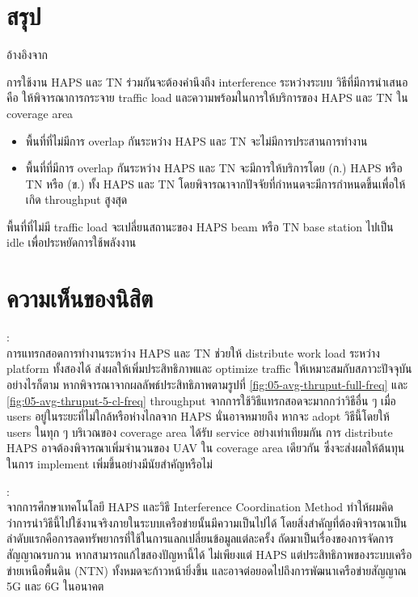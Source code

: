 \section{สรุป}

อ้างอิงจาก \cite[Interference Coordination Method for Integrated HAPS-Terrestrial Networks]{liu2021interference}

การใช้งาน HAPS และ TN ร่วมกันจะต้องคำนึงถึง interference ระหว่างระบบ
วิธีที่มีการนำเสนอคือ ให้พิจารณาการกระจาย traffic load และความพร้อมในการให้บริการของ
HAPS และ TN ใน coverage area

\begin{itemize}
    \item พื้นที่ที่ไม่มีการ overlap กันระหว่าง HAPS และ TN จะไม่มีการประสานการทำงาน
    \item พื้นที่ที่มีการ overlap กันระหว่าง HAPS และ TN จะมีการให้บริการโดย (ก.) HAPS หรือ TN หรือ (ข.) ทั้ง HAPS และ TN
            โดยพิจารณาจากปัจจัยที่กำหนดจะมีการกำหนดขึ้นเพื่อให้เกิด throughput สูงสุด
\end{itemize}

พื้นที่ที่ไม่มี traffic load จะเปลี่ยนสถานะของ HAPS beam หรือ TN base station ไปเป็น idle เพื่อประหยัดการใช้พลังงาน

\section{ความเห็นของนิสิต}

\begin{multicols}{2}
\begin{minipage}{0.4\textwidth}
\textbf{\authorAName}:\\
การแทรกสอดการทำงานระหว่าง HAPS และ TN ช่วยให้ distribute work load
ระหว่าง platform ทั้งสองได้ ส่งผลให้เพิ่มประสิทธิภาพและ optimize traffic
ให้เหมาะสมกับสภาวะปัจจุบัน อย่างไรก็ตาม หากพิจารณาจากผลลัพธ์ประสิทธิภาพตามรูปที่ 
\ref{fig:05-avg-thruput-full-freq} และ \ref{fig:05-avg-thruput-5-cl-freq}
throughput จากการใช้วิธีแทรกสอดจะมากกว่าวิธีอื่น ๆ เมื่อ users อยู่ในระยะที่ไม่ใกล้หรือห่างไกลจาก HAPS
นั่นอาจหมายถึง หากจะ adopt วิธีนี้โดยให้ users ในทุก ๆ บริเวณของ coverage area
ได้รับ service อย่างเท่าเทียมกัน การ distribute HAPS อาจต้องพิจารณาเพิ่มจำนวนของ
UAV ใน coverage area เดียวกัน ซึ่งจะส่งผลให้ต้นทุนในการ implement เพิ่มขึ้นอย่างมีนัยสำคัญหรือไม่
\end{minipage}

\columnbreak

\begin{minipage}{0.4\textwidth}
\textbf{\authorBName}:\\
จากการศึกษาเทคโนโลยี HAPS และวิธี Interference Coordination Method ทำให้ผมคิดว่าการนำวิธีนี้ไปใช้งานจริงภายในระบบเครือข่ายนั้นมีความเป็นไปได้ 
โดยสิ่งสำคัญที่ต้องพิจารณาเป็นลำดับแรกคือการลดทรัพยากรที่ใช้ในการแลกเปลี่ยนข้อมูลแต่ละครั้ง ถัดมาเป็นเรื่องของการจัดการสัญญาณรบกวน
หากสามารถแก้ไขสองปัญหานี้ได้ ไม่เพียงแต่ HAPS แต่ประสิทธิภาพของระบบเครือข่ายเหนือพื้นดิน (NTN) ทั้งหมดจะก้าวหน้ายิ่งขึ้น 
และอาจต่อยอดไปถึงการพัฒนาเครือข่ายสัญญาณ 5G และ 6G ในอนาคต
\end{minipage}
\end{multicols}

